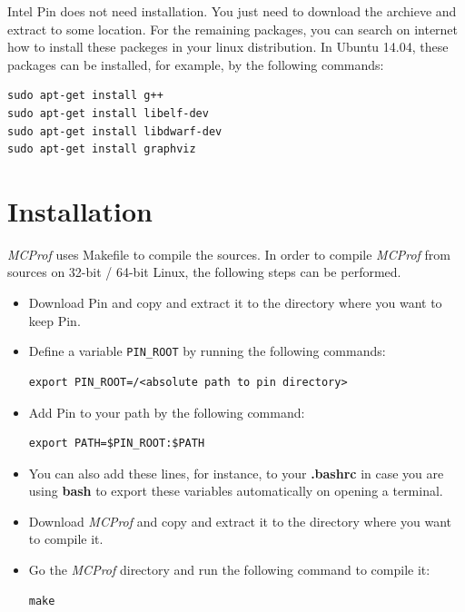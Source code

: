 \documentclass[11pt]{article}
\newcommand{\MCPROF}{\emph{MCProf}}
\begin{document}
Intel Pin does not need installation. You just need to download the archieve and 
extract to some location. For the remaining packages, you can search on internet 
how to install these packeges in your linux distribution. In Ubuntu 14.04, these 
packages can be installed, for example, by the following commands:

{
\small
\begin{Verbatim}[frame=single, samepage=true]
sudo apt-get install g++
sudo apt-get install libelf-dev
sudo apt-get install libdwarf-dev
sudo apt-get install graphviz
\end{Verbatim}
}



\section{Installation}
\label{sec:installation}

\MCPROF{} uses Makefile to compile the sources. In order to compile \MCPROF{}
from sources on 32-bit / 64-bit Linux, the following steps can be performed.

\begin{itemize}

\item Download Pin and copy and extract it to the directory where you want to
    keep Pin.

\item Define a variable \verb|PIN_ROOT| by running the following commands:

{
\small
\begin{Verbatim}[frame=single]
export PIN_ROOT=/<absolute path to pin directory>
\end{Verbatim}
}

\item Add Pin to your path by the following command:
{
\small
\begin{Verbatim}[frame=single]
export PATH=$PIN_ROOT:$PATH
\end{Verbatim}
}

\item You can also add these lines, for instance, to your \textbf{.bashrc} in case
    you are using \textbf{bash} to export these variables automatically on opening
    a terminal.

\item Download \MCPROF{} and copy and extract it to the directory where you want
    to compile it.

\item Go the \MCPROF{} directory and run the following command to compile it:

{
\small
\begin{Verbatim}[frame=single]
make
\end{Verbatim}
}

\end{itemize}
\end{document}
